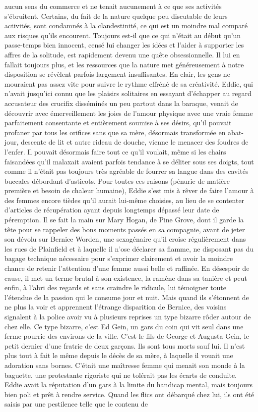 aucun sens du commerce et ne tenait aucunement à ce que ses activités s’ébruitent. Certains, du fait de la nature quelque peu discutable de leurs activités, sont condamnés à la clandestinité, ce qui est un moindre mal comparé aux risques qu’ils encourent. Toujours est-il que ce qui n’était au début qu’un passe-temps bien innocent, censé lui changer les idées et l’aider à supporter les affres de la solitude, est rapidement devenu une quête obsessionnelle. Il lui en fallait toujours plus, et les ressources que la nature met généreusement à notre disposition se révèlent parfois largement insuffisantes. En clair, les gens ne mouraient pas assez vite pour suivre le rythme effréné de sa créativité. Eddie, qui n’avait jusqu’ici connu que les plaisirs solitaires en essayant d’échapper au regard accusateur des crucifix disséminés un peu partout dans la baraque, venait de découvrir avec émerveillement les joies de l’amour physique avec une vraie femme parfaitement consentante et entièrement soumise à ses désirs, qu’il pouvait profaner par tous les orifices sans que sa mère, désormais transformée en abat-jour, descente de lit et autre rideau de douche, vienne le menacer des foudres de l’enfer. Il pouvait désormais faire tout ce qu’il voulait, même si les chairs faisandées qu’il malaxait avaient parfois tendance à se déliter sous ses doigts, tout comme il n’était pas toujours très agréable de fourrer sa langue dans des cavités buccales débordant d’asticots. Pour toutes ces raisons (pénurie de matière première et besoin de chaleur humaine), Eddie s’est mis à rêver de faire l’amour à des femmes encore tièdes qu’il aurait lui-même choisies, au lieu de se contenter d’articles de récupération ayant depuis longtemps dépassé leur date de péremption. Il se fait la main sur Mary Hogan, de Pine Grove, dont il garde la tête pour se rappeler des bons moments passés en sa compagnie, avant de jeter son dévolu sur Bernice Worden, une sexagénaire qu’il croise régulièrement dans les rues de Plainfield et à laquelle il n’ose déclarer sa flamme, ne disposant pas du bagage technique nécessaire pour s’exprimer clairement et avoir la moindre chance de retenir l’attention d’une femme aussi belle et raffinée. En désespoir de cause, il met un terme brutal à son existence, la ramène dans sa tanière et peut enfin, à l’abri des regards et sans craindre le ridicule, lui témoigner toute l’étendue de la passion qui le consume jour et nuit. Mais quand ils s’étonnent de ne plus la voir et apprennent l’étrange disparition de Bernice, des voisins signalent à la police avoir vu à plusieurs reprises un type bizarre rôder autour de chez elle. Ce type bizarre, c’est Ed Gein, un gars du coin qui vit seul dans une ferme pourrie des environs de la ville. C’est le fils de George et Augusta Gein, le petit dernier d’une fratrie de deux garçons. Ils sont tous morts sauf lui. Il n’est plus tout à fait le même depuis le décès de sa mère, à laquelle il vouait une adoration sans bornes. C’était une maîtresse femme qui menait son monde à la baguette, une protestante rigoriste qui ne tolérait pas les écarts de conduite. Eddie avait la réputation d’un gars à la limite du handicap mental, mais toujours bien poli et prêt à rendre service. Quand les flics ont débarqué chez lui, ils ont été saisis par une pestilence telle que le contenu de 